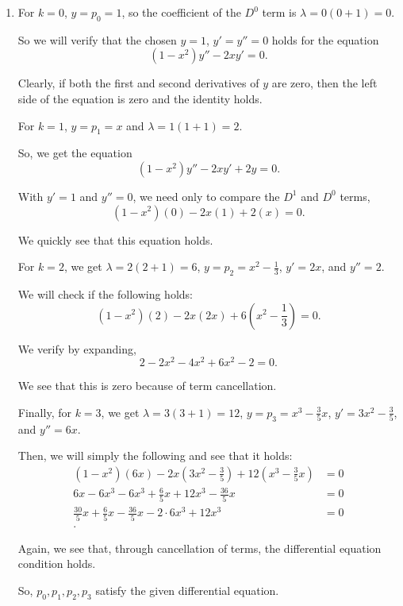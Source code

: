 \documentclass{article}
\begin{document}
\begin{enumerate}[label=(\alph*)]
    \item For $k=0$, $y=p_0=1$, so the coefficient of the $D^{0}$ term is $\lambda=0(0+1)=0$. 

    So we will verify that the chosen $y=1$, $y'=y''=0$ holds for the equation  \[
      (1-x^{2})y''-2xy'=0 
    .\] 

    Clearly, if both the first and second derivatives of $y$ are zero, then the left side of the equation is zero and the identity holds. 

    For $k=1$, $y=p_1=x$ and $\lambda=1(1+1)=2$. 

    So, we get the equation \[
      (1-x^{2})y''-2xy'+2y=0 
    .\] 

    With $y'=1$ and $y''=0$, we need only to compare the $D^1$ and $D^0$ terms,
     \[
       (1-x^2)(0)-2x(1)+2(x)=0
    .\] 

    We quickly see that this equation holds.

    For $k=2$, we get $\lambda=2(2+1)=6$, $y=p_2=x^2-\frac{1}{3}$, $y'=2x$, and $y''=2$. 

    We will check if the following holds: \[
      (1-x^2)(2)-2x(2x)+6\left( x^{2}-\frac{1}{3} \right)=0
    .\] 

    We verify by expanding, \[
    2-2x^{2}-4x^{2}+6x^{2}-2=0 
    .\] 

    We see that this is zero because of term cancellation.

    Finally, for $k=3$, we get $\lambda=3(3+1)=12$, $y=p_3=x^3-\frac{3}{5}x$, $y'=3x^2-\frac{3}{5}$, and $y''=6x$. 

    Then, we will simply the following and see that it holds:
    \begin{align*}
      (1-x^2)(6x)-2x\left( 3x^2-\frac{3}{5} \right)+12\left( x^3 - \frac{3}{5} x \right) &=0\\
      6x-6x^3-6x^3+\frac{6}{5}x+12x^3-\frac{36}{5}x &= 0 \\
      \frac{30}{5}x+\frac{6}{5}x-\frac{36}{5}x-2\cdot 6x^3+12x^3&= 0 \\
    .\end{align*}

    Again, we see that, through cancellation of terms, the differential equation condition holds.

    So, $p_0,p_1,p_2,p_3$ satisfy the given differential equation. 
\end{enumerate}
\end{document}
